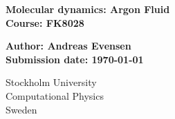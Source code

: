 \thispagestyle{empty}
\begin{titlepage}
   \begin{center}
       \huge
       \textbf{Molecular dynamics: Argon Fluid}\\
       \vspace*{1cm}
       \textbf{Course: FK8028}
       \large

       \vspace*{0.5cm}
       \textbf{Author: Andreas Evensen}\\
       \vspace*{.5cm}
       \small
       \vspace*{1.cm}
       \textbf{Submission date: \today}\\
       \vspace*{.5cm}
       \vspace{0.8cm}
     
       \small
       Stockholm University\\
       Computational Physics\\
       Sweden\\
   \end{center}
\end{titlepage}